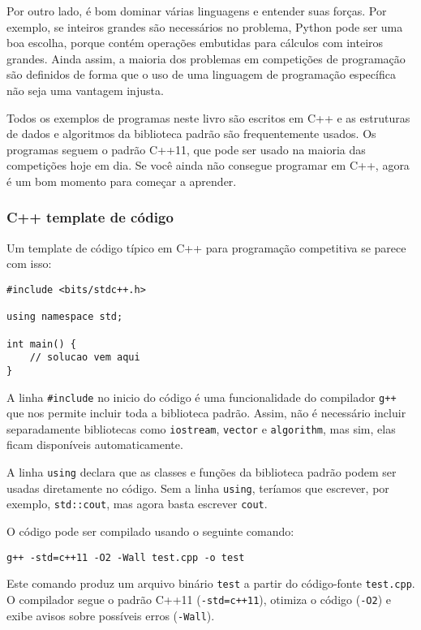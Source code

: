 Por outro lado, é bom dominar várias linguagens e entender suas forças. Por exemplo, se inteiros grandes são necessários no problema, Python pode ser uma boa escolha, porque contém operações embutidas para cálculos com inteiros grandes. Ainda assim, a maioria dos problemas em competições de programação são definidos de forma que o uso de uma linguagem de programação específica não seja uma vantagem injusta.

Todos os exemplos de programas neste livro são escritos em C++ e as estruturas de dados e algoritmos da biblioteca padrão são frequentemente usados. Os programas seguem o padrão C++11, que pode ser usado na maioria das competições hoje em dia. Se você ainda não consegue programar em C++, agora é um bom momento para começar a aprender.

\subsubsection{C++ template de código}

Um template de código típico em C++ para programação competitiva se parece com isso:

\begin{lstlisting}
#include <bits/stdc++.h>

using namespace std;

int main() {
    // solucao vem aqui
}
\end{lstlisting}

A linha \texttt{\#include} no inicio do código é uma funcionalidade do compilador \texttt{g++} que nos permite incluir toda a biblioteca padrão. Assim, não é necessário incluir separadamente bibliotecas como \texttt{iostream}, \texttt{vector} e \texttt{algorithm},
mas sim, elas ficam disponíveis automaticamente.

A linha \texttt{using} declara que as classes e funções da biblioteca padrão podem ser usadas diretamente no código. Sem a linha \texttt{using}, teríamos que escrever, por exemplo, \texttt{std::cout}, mas agora basta escrever \texttt{cout}.

O código pode ser compilado usando o seguinte comando:

\begin{lstlisting}
g++ -std=c++11 -O2 -Wall test.cpp -o test
\end{lstlisting}

Este comando produz um arquivo binário \texttt{test} a partir do código-fonte \texttt{test.cpp}. O compilador segue o padrão C++11 (\texttt{-std=c++11}), otimiza o código (\texttt{-O2}) e exibe avisos sobre possíveis erros (\texttt{-Wall}).

